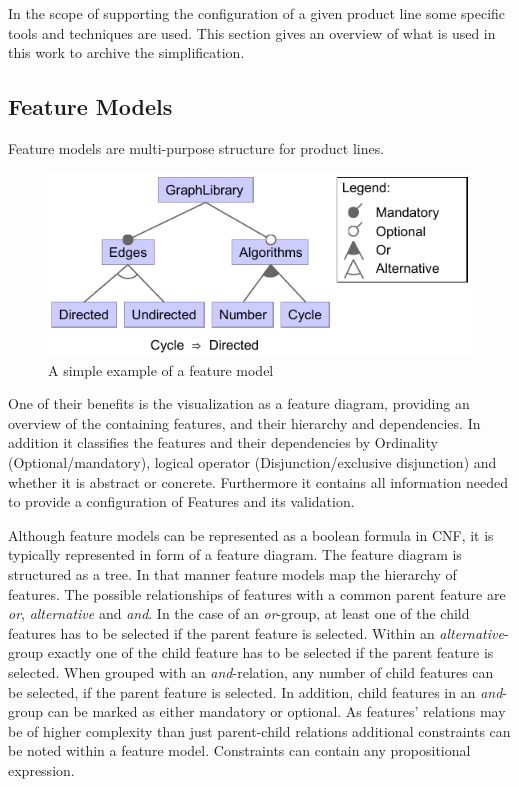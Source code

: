 In the scope of supporting the configuration of a given product line some specific tools and techniques are used. This section gives an overview of what is used in this work to archive the simplification.

\subsection{Feature Models}
Feature models are multi-purpose structure for product lines. 
\begin{figure}
	\includegraphics{img/img-fm.pdf}
	\caption{A simple example of a feature model}
	\label{img-fm}
\end{figure}
One of their benefits is the visualization as a feature diagram, providing an overview of the containing features, and their hierarchy and dependencies. In addition it classifies the features and their dependencies by Ordinality (Optional/mandatory), logical operator (Disjunction/exclusive disjunction) and whether it is abstract or concrete. Furthermore it contains all information needed to provide a configuration of Features and its validation.

Although feature models can be represented as a boolean formula in CNF, it is typically represented in form of a feature diagram. The feature diagram is structured as a tree. In that manner feature models map the hierarchy of features. The possible relationships of features with a common parent feature are \textit{or}, \textit{alternative} and \textit{and}. In the case of an \textit{or}-group, at least one of the child features has to be selected if the parent feature is selected. Within an \textit{alternative}-group exactly one of the child feature has to be selected if the parent feature is selected. When grouped with an \textit{and}-relation, any number of child features can be selected, if the parent feature is selected. In addition, child features in an \textit{and}-group can be marked as either mandatory or optional.  As features' relations may be of higher complexity than just parent-child relations additional constraints can be noted within a feature model. Constraints can contain any propositional expression.

